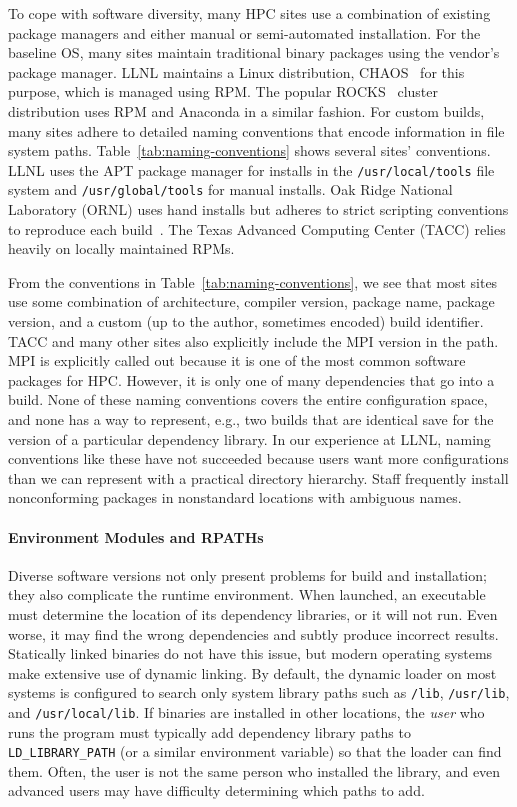 To cope with software diversity, many HPC sites use a combination of existing
package managers and either manual or semi-automated installation.
For the baseline OS, many sites maintain traditional binary
packages using the vendor's package manager. LLNL maintains a Linux
distribution, CHAOS~\cite{chaos} for this purpose, which is managed using RPM.
The popular ROCKS~\cite{rocks} cluster distribution uses RPM and Anaconda
in a similar fashion.
%
For custom builds, many sites adhere to detailed naming conventions
that encode information in file system paths.
Table~\ref{tab:naming-conventions} shows several sites' conventions.
LLNL uses the APT package manager for installs
in the {\tt /usr/local/tools} file system and {\tt /usr/global/tools}
for manual installs.
Oak Ridge National Laboratory (ORNL) uses hand installs but adheres
to strict scripting conventions
to reproduce each build~\cite{jones+:cug08}.
The Texas Advanced Computing Center (TACC) relies heavily on locally maintained RPMs.

From the conventions in Table~\ref{tab:naming-conventions},
we see that most sites use some combination of architecture, compiler version,
package name, package version, and a custom (up to the author, sometimes
encoded) build identifier.  TACC and many other sites also explicitly
include the MPI version in the path. MPI is explicitly called out
because it is one of the most common software packages for HPC.
However, it is only one of many dependencies that go into a build.
None of these naming conventions covers the entire configuration
space, and none has a way to represent, e.g., two builds that are identical
save for the version of a particular dependency library.  In our experience
at LLNL, naming conventions like these have not succeeded because
users want more configurations than we can represent with a practical
directory hierarchy. Staff frequently install nonconforming packages
in nonstandard locations with ambiguous names.

\paragraph{Environment Modules and RPATHs}\label{sec:env-rpath}

Diverse software versions not only present problems for build and installation;
they also complicate the runtime environment. When launched, an executable
must determine the location of its dependency libraries, or it will not run.
Even worse, it may find the wrong dependencies and subtly produce incorrect results.
Statically linked binaries do not have this issue, but modern
operating systems make extensive use of dynamic linking.
By default, the dynamic loader on most systems is configured to search only
system library paths such as {\tt /lib}, {\tt /usr/lib}, and
{\tt /usr/local/lib}.  If binaries are installed in other locations, the
{\it user} who runs the program must typically add dependency library paths to
{\tt LD\_LIBRARY\_PATH} (or a similar environment variable) so that the loader
can find them.  Often, the user is not the same person who installed the library,
and even advanced users may have difficulty determining which paths to add.

